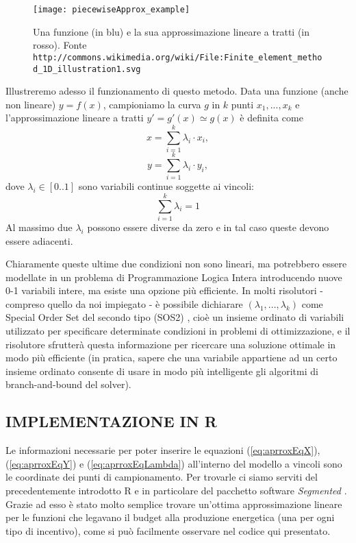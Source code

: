 \documentclass[12pt,a4paper,openright,twoside]{report}
\begin{document}
\begin{figure}[htb]
	\begin{center}
	\texttt{[image: piecewiseApprox\_example]}
	\end{center}
	\caption{Una funzione (in blu) e la sua approssimazione lineare a tratti (in rosso). Fonte {\tt http://commons.wikimedia.org/wiki/File:Finite\_element\_method\_1D\_illustration1.svg}}
  	\label{piecewiseApprox_example}
\end{figure}

Illustreremo adesso il funzionamento di questo metodo. Data una funzione (anche non lineare) $y=f(x)$, campioniamo la curva $g$ in $k$ punti $x_1,...,x_k$ e l'approssimazione lineare a tratti $y'=g'(x)\simeq g(x)$ è definita come
\begin{equation} 
\label{eq:aprroxEqX}
	x = \sum_{i=1}^k \lambda_i \cdot x_i,
\end{equation}
\begin{equation} 
\label{eq:aprroxEqY}
	y = \sum_{i=1}^k \lambda_i \cdot y_i,
\end{equation}
dove $\lambda_i \in [0..1]$ sono variabili continue soggette ai vincoli:
\begin{equation} 
\label{eq:aprroxEqLambda}
		\sum_{i=1}^k \lambda_i = 1
\end{equation}
Al massimo due $\lambda_i$ possono essere diverse da zero e in tal caso queste devono essere adiacenti.

Chiaramente queste ultime due condizioni non sono lineari, ma potrebbero essere modellate in un problema di Programmazione Logica Intera introducendo nuove 0-1 variabili intere, ma esiste una opzione più efficiente. In molti risolutori - compreso quello da noi impiegato - è possibile dichiarare $(\lambda_1,...,\lambda_k)$ come Special Order Set del secondo tipo (SOS2) \cite{bealeTomlin}, cioè un insieme ordinato di variabili utilizzato per specificare  determinate condizioni in problemi di ottimizzazione, e il risolutore sfrutterà questa informazione per ricercare una soluzione ottimale in modo più efficiente (in pratica, sapere che una variabile appartiene ad un certo insieme ordinato consente di usare in modo più intelligente gli algoritmi di branch-and-bound del solver).

\subsection{IMPLEMENTAZIONE IN R}

Le informazioni necessarie per poter inserire le equazioni (\ref{eq:aprroxEqX}), (\ref{eq:aprroxEqY}) e (\ref{eq:aprroxEqLambda}) all'interno del modello a vincoli sono le coordinate dei punti di campionamento. Per trovarle ci siamo serviti del precedentemente introdotto R e in particolare del pacchetto software \emph{Segmented} \cite{segmentedPackage}. Grazie ad esso è stato molto semplice trovare un'ottima approssimazione lineare per le funzioni che legavano il budget alla produzione energetica (una per ogni tipo di incentivo), come si può facilmente osservare nel codice qui presentato.
\end{document}
